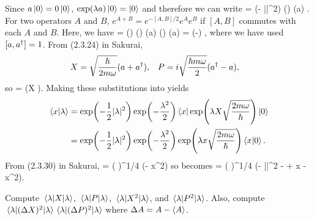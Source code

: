 \begin{solution}
	Since $a \ket{0} = 0 \ket{0}$, $\exp(\lambda a) \ket{0} = \ket{0}$ and therefore we can write
	\beqn \label{ugh1}
		\bkxlam = \exp(- |\lam|^2) \bx \exp(\lam \ad) \exp(\lam a) \ko.
	\eeqn
	For two operators $A$ and $B$, $e^{A + B} = e^{-[A, B] / 2} e^A e^B$ if $[A, B]$ commutes with each $A$ and $B$.  Here, we have
	\beq
		\exp[\lam(\ad + a)] = \exp() \exp(\lam \ad) \exp(\lam a) \implies \exp(\lam \ad) \exp(\lam a) = \exp(-) \exp[\lam(\ad + a)],
	\eeq
	where we have used $[a, a^\dagger] = 1$.  From (2.3.24) in Sakurai,
	\begin{align} \label{xpa}
		X &= \sqrt{\frac{\hbar}{2 m \omega}} (a + a^\dagger), &
		P &= i \sqrt{\frac{\hbar m \omega}{2}} (a^\dagger - a),
	\end{align}
	so
	\beq
		\exp[\lam(\ad + a)] = \exp(\lam X ).
	\eeq
	Making these substitutions into  yields
	\begin{align}
		\braket{x}{\lambda} &= \exp(-\frac{1}{2} |\lambda|^2) \exp(-\frac{\lambda^2}{2}) \bra{x} \exp(\lambda X \sqrt{\frac{2 m \omega}{\hbar}}) \ket{0} \notag \\
		&= \exp(-\frac{1}{2} |\lambda|^2) \exp(-\frac{\lambda^2}{2}) \exp(\lambda x \sqrt{\frac{2 m \omega}{\hbar}}) \braket{x}{0}. \label{ugh2}
	\end{align}
	From (2.3.30) in Sakurai,
	\beq
		\bkxo = \left(  \right)^{1/4} \exp(- x^2)
	\eeq
	so  becomes
	\beq
		\bkxlam = \left(  \right)^{1/4} \exp(- |\lam|^2 -  + \lam x  -  x^2).
	\eeq
\end{solution}

\clearpage
\begin{problem}
	Compute $\ev{X}{\lam}$, $\ev{P}{\lam}$, $\ev{X^2}{\lam}$, and $\ev{P^2}{\lam}$.  Also, compute $\ev{(\DX)^2}{\lam} \ev{(\DP)^2}{\lam}$ where $\DA = A - \ev{A}$.
\end{problem}

